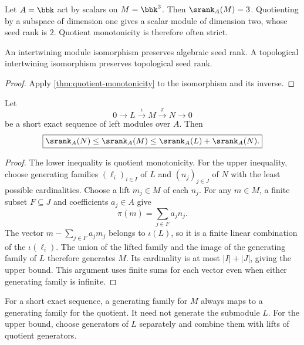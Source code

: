\begin{microexample}[title={A quotient can strictly lower seed rank}]
Let \(A=\bbk\) act by scalars on \(M=\bbk^3\).  Then \(\srank_A(M)=3\).  Quotienting by a subspace of dimension one gives a scalar module of dimension two, whose seed rank is \(2\).  Quotient monotonicity is therefore often strict.
\end{microexample}


\begin{corollary}
\label{cor:isomorphism-invariance}
An intertwining module isomorphism preserves algebraic seed rank.  A topological intertwining isomorphism preserves topological seed rank.
\end{corollary}

\begin{proof}
Apply \cref{thm:quotient-monotonicity} to the isomorphism and its inverse.
\end{proof}

\begin{theorem}
\label{thm:exact-sequence-bounds}
Let
\[
0\longrightarrow L\xrightarrow{\iota}M\xrightarrow{\pi}N\longrightarrow0
\]
be a short exact sequence of left modules over $A$.  Then
\[
\boxed{
\srank_A(N)\leq\srank_A(M)
\leq\srank_A(L)+\srank_A(N).
}
\]
\end{theorem}

\begin{proof}
The lower inequality is quotient monotonicity. For the upper inequality, choose generating families $(\ell_i)_{i\in I}$ of $L$ and $(n_j)_{j\in J}$ of $N$ with the least possible cardinalities. Choose a lift $m_j\in M$ of each $n_j$. For any $m\in M$, a finite subset $F\subseteq J$ and coefficients $a_j\in A$ give
\[
\pi(m)=\sum_{j\in F}a_jn_j.
\]
The vector $m-\sum_{j\in F}a_jm_j$ belongs to $\iota(L)$, so it is a finite linear combination of the $\iota(\ell_i)$. The union of the lifted family and the image of the generating family of $L$ therefore generates $M$. Its cardinality is at most $|I|+|J|$, giving the upper bound. This argument uses finite sums for each vector even when either generating family is infinite.
\end{proof}

\begin{hypothesisguide}
For a short exact sequence, a generating family for \(M\) always maps to a generating family for the quotient.  It need not generate the submodule \(L\).  For the upper bound, choose generators of \(L\) separately and combine them with lifts of quotient generators.
\end{hypothesisguide}


